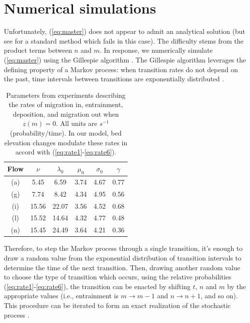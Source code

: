 \documentclass[draft]{agujournal2018}
\begin{document}
\section{Numerical simulations}

Unfortunately, (\ref{eq:master}) does not appear to admit an analytical solution (but see \citet{Swift2002} for a standard method which fails in this case).
The difficulty stems from the product terms between $n$ and $m$.
In response, we numerically simulate (\ref{eq:master}) using the Gillespie algorithm \citep{Gillespie1977, Gillespie1992, Gillespie2007}.
The Gillespie algorithm leverages the defining property of a Markov process: when transition rates do not depend on the past, time intervals between transitions are exponentially distributed \citep[e.g.][]{Cox1965}.



\begin{table}
	\caption{Parameters from \citet{Ancey2008} experiments describing the rates of migration in, entrainment, deposition, and migration out when $z(m)=0$. All units are $s^{-1}$ (probability/time). In our model, bed elevation changes modulate these rates in accord with (\ref{eq:rate1}-\ref{eq:rate6}).}\label{tab:anceyparams}
	\begin{tabular}{cccccc} \\ 
		\toprule  
		Flow & $\nu$ & $\lambda_0$ & $\mu_0$ & $\sigma_0$ & $\gamma$ \\
		\midrule
		(a) & 5.45  & 6.59  & 3.74 & 4.67 & 0.77 \\
		\midrule
		(g) & 7.74  & 8.42  & 4.34 & 4.95 & 0.56 \\
		\midrule
		(i) & 15.56 & 22.07 & 3.56 & 4.52 & 0.68 \\
		\midrule
		(l) & 15.52 & 14.64 & 4.32 & 4.77 & 0.48 \\
		\midrule
		(n) & 15.45 & 24.49 & 3.64 & 4.21 & 0.36 \\
		\bottomrule
	\end{tabular}
\end{table} 

Therefore, to step the Markov process through a single transition, it's enough to draw a random value from the exponential distribution of transition intervals to determine the time of the next transition.
Then, drawing another random value to choose the type of transition which occurs, using the relative probabilities (\ref{eq:rate1}-\ref{eq:rate6}), the transition can be enacted by shifting $t$, $n$ and $m$ by the appropriate values (i.e., entrainment is $m\rightarrow m-1$ and $n \rightarrow n+1$, and so on).
This procedure can be iterated to form an exact realization of the stochastic process \citep[e.g.][]{Gillespie2007}.
\end{document}
